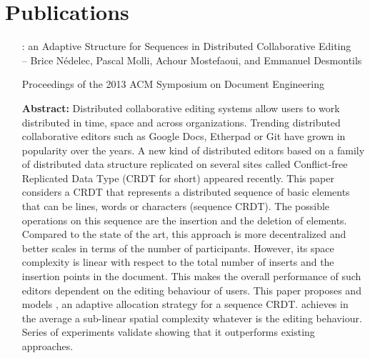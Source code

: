 
\section{Publications}


\begin{itemize}
\item [\LSEQ: an Adaptive Structure for Sequences in Distributed Collaborative
  Editing]\ \\-- Brice Nédelec, Pascal Molli, Achour Mostefaoui, and Emmanuel
  Desmontils
\item [Proceedings of the 2013 ACM Symposium on Document Engineering]
\item [\textbf{Abstract:}] {\small Distributed collaborative editing systems
    allow users to work distributed in time, space and across
    organizations. Trending distributed collaborative editors such as Google
    Docs, Etherpad or Git have grown in popularity over the years. A new kind of
    distributed editors based on a family of distributed data structure
    replicated on several sites called Conflict-free Replicated Data Type (CRDT
    for short) appeared recently. This paper considers a CRDT that represents a
    distributed sequence of basic elements that can be lines, words or
    characters (sequence CRDT). The possible operations on this sequence are the
    insertion and the deletion of elements. Compared to the state of the art,
    this approach is more decentralized and better scales in terms of the number
    of participants. However, its space complexity is linear with respect to the
    total number of inserts and the insertion points in the document. This makes
    the overall performance of such editors dependent on the editing behaviour
    of users. This paper proposes and models \LSEQ, an adaptive allocation
    strategy for a sequence CRDT. \LSEQ achieves in the average a sub-linear
    spatial complexity whatever is the editing behaviour. Series of experiments
    validate \LSEQ showing that it outperforms existing approaches.}

\end{itemize}

